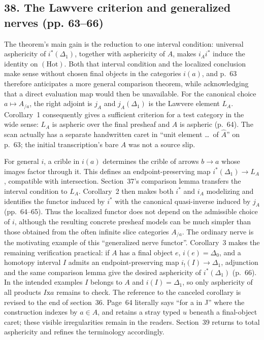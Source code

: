 \subsection*{38. The Lawvere criterion and generalized nerves (pp. 63--66)}
The theorem's main gain is the reduction to one interval condition: universal asphericity of $i^*(\Delta_1)$, together with asphericity of $A$, makes $i_Ai^*$ induce the identity on $(\mathrm{Hot})$. Both that interval condition and the localized conclusion make sense without chosen final objects in the categories $i(a)$, and p.~63 therefore anticipates a more general comparison theorem, while acknowledging that a direct evaluation map would then be unavailable. For the canonical choice $a\mapsto A_{/a}$, the right adjoint is $j_A$ and $j_A(\Delta_1)$ is the Lawvere element $L_A$. Corollary~1 consequently gives a sufficient criterion for a test category in the wide sense: $L_A$ is aspheric over the final presheaf and $A$ is aspheric (p.~64). The scan actually has a separate handwritten caret in ``unit element \ldots\ of $\widehat A$'' on p.~63; the initial transcription's bare $A$ was not a source slip.

For general $i$, a crible in $i(a)$ determines the crible of arrows $b\to a$ whose images factor through it. This defines an endpoint-preserving map $i^*(\Delta_1)\to L_A$, compatible with intersection. Section~37's comparison lemma transfers the interval condition to $L_A$. Corollary~2 then makes both $i^*$ and $i_A$ modelizing and identifies the functor induced by $i^*$ with the canonical quasi-inverse induced by $j_A$ (pp.~64--65). Thus the localized functor does not depend on the admissible choice of $i$, although the resulting concrete presheaf models can be much simpler than those obtained from the often infinite slice categories $A_{/a}$. The ordinary nerve is the motivating example of this ``generalized nerve functor''. Corollary~3 makes the remaining verification practical: if $A$ has a final object $e$, $i(e)=\Delta_0$, and a homotopy interval $I$ admits an endpoint-preserving map $i_!(I)\to\Delta_1$, adjunction and the same comparison lemma give the desired asphericity of $i^*(\Delta_1)$ (p.~66). In the intended examples $I$ belongs to $A$ and $i(I)=\Delta_1$, so only asphericity of all products $I\mathrm{x}a$ remains to check. The reference to the canceled corollary is revised to the end of section~36. Page~64 literally says ``for a in J'' where the construction indexes by $a\in A$, and retains a stray typed $u$ beneath a final-object caret; these visible irregularities remain in the readers. Section~39 returns to total asphericity and refines the terminology accordingly.

